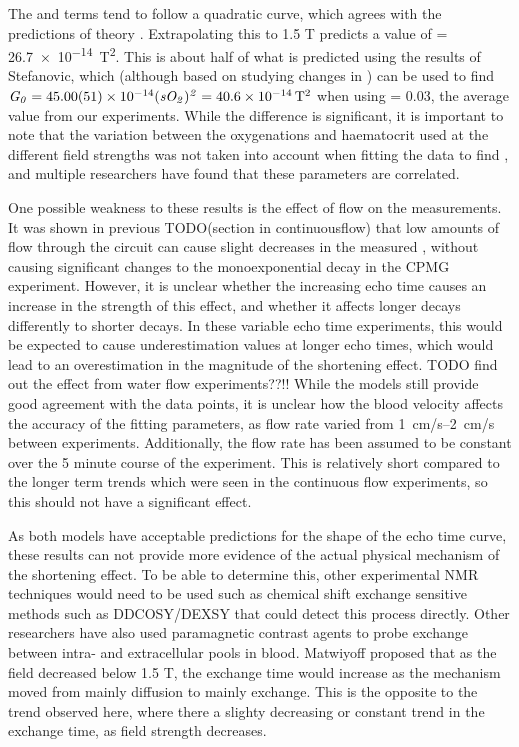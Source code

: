 The \Kzero and \Gzero terms tend to follow a quadratic curve, which agrees with the predictions of theory \cite[Eq. 52-54]{JensenNMRrelaxationtissues2000}.
Extrapolating this to 1.5 T predicts a value of \Gzero = \SI{26.7e-14}{T^2}.
This is about half of what is predicted using the results of Stefanovic, which (although based on studying changes in \SOtwo) can be used to find $\mathit{G_0} = \num{45\pm0.51e-14}  \mathit{(sO_2)^2} = \SI{40.6e-14}{T^2}$ when using \SOtwo = 0.03, the average value from our experiments.
While the difference is significant, it is important to note that the variation between the oxygenations and haematocrit used at the different field strengths was not taken into account when fitting the data to find \Gzero, and multiple researchers \cite{StefanovicHumanwholebloodrelaxometry2004,ChenHumanwholeblood2009,GardenerDependencebloodR22010} have found that these parameters are correlated.

One possible weakness to these results is the effect of flow on the \Ttwo measurements.
It was shown in previous TODO(section in continuousflow) that low amounts of flow through the circuit can cause slight decreases in the measured \Ttwo, without causing significant changes to the monoexponential decay in the CPMG experiment.
However, it is unclear whether the increasing echo time causes an increase in the strength of this effect, and whether it affects longer \Ttwo decays differently to shorter decays.
In these variable echo time experiments, this would be expected to cause underestimation \Ttwo values at longer echo times, which would lead to an overestimation in the magnitude of the \Ttwo shortening effect.
TODO find out the effect from water flow experiments??!!
While the models still provide good agreement with the data points, it is unclear how the blood velocity affects the accuracy of the fitting parameters, as flow rate varied from \SIrange{1}{2}{cm/s} between experiments.
Additionally, the flow rate has been assumed to be constant over the 5 minute course of the experiment.
This is relatively short compared to the longer term trends which were seen in the continuous flow experiments, so this should not have a significant effect.

As both models have acceptable predictions for the shape of the echo time curve, these results can not provide more evidence of the actual physical mechanism of the \Ttwo shortening effect.
To be able to determine this, other experimental NMR techniques would need to be used such as chemical shift exchange sensitive methods such as DDCOSY/DEXSY that could detect this process directly.
Other researchers have also used paramagnetic contrast agents to probe exchange between intra- and extracellular pools in blood\cite{LiIntegratedanalysisdiffusion1998}.
Matwiyoff \cite{Matwiyofflineshapeswater1990} proposed that as the field decreased below 1.5 T, the exchange time would increase as the mechanism moved from mainly diffusion to mainly exchange.
This is the opposite to the trend observed here, where there a slighty decreasing or constant trend in the exchange time, as field strength decreases.

